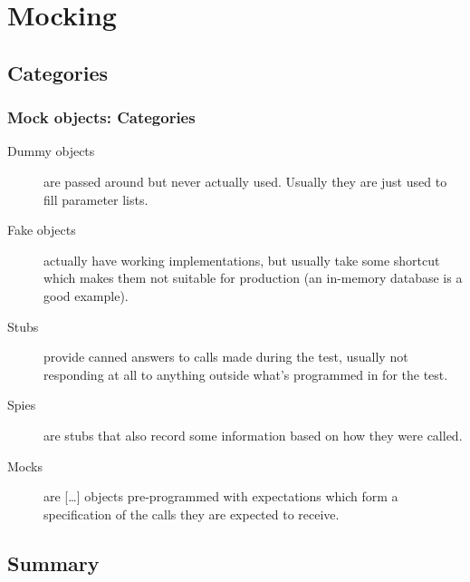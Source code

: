 
\section{Mocking}


\subsection{Categories}

\begin{frame}
 \frametitle{Mock objects: Categories}
 \footnotesize
 \begin{description}
  \item[Dummy objects] are passed around but never actually used. Usually they are just used to fill parameter lists.
  \item[Fake objects] actually have working implementations, but usually take some shortcut which makes them not suitable for production (an in-memory database is a good example).
  \item[Stubs] provide canned answers to calls made during the test, usually not responding at all to anything outside what's programmed in for the test.
  \item[Spies] are stubs that also record some information based on how they were called.
  \item[Mocks] are [\dots] objects pre-programmed with expectations which form a specification of the calls they are expected to receive.
 \end{description}
\end{frame}


\subsection{Summary}


